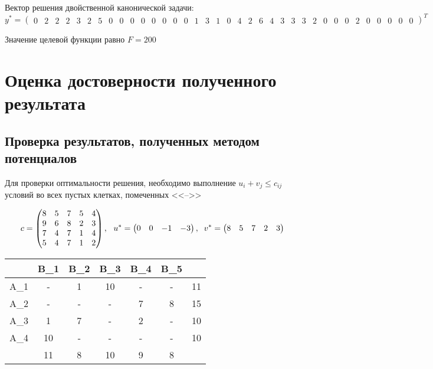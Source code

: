 \documentclass{article}
\begin{document}
\noindent Вектор решения двойственной канонической задачи: 
\begin{equation*}
    y^* = \begin{pmatrix}
        0& 2& 2& 2& 3& 2& 5 & 0& 0& 0& 0& 0 &0& 0& 0 & 1 & 3 & 1 & 0 & 4 & 2 & 6 & 4 & 3 & 3 & 3 & 2 & 0 & 0 & 0 & 2 &0 & 0 & 0 & 0 & 0
    \end{pmatrix}^T
\end{equation*}

\noindent Значение целевой функции равно $F=200$

\section{Оценка достоверности полученного результата}
\subsection{Проверка результатов, полученных методом потенциалов}
\noindent Для проверки оптимальности решения, необходимо выполнение $u_i+v_j \le c_{ij}$ условий во всех пустых клетках, помеченных <<-->>

\begin{equation*}
 c = 
    \begin{pmatrix}
        8 & 5 & 7 & 5 & 4 \\
        9 & 6 & 8 & 2 & 3\\
        7 & 4 & 7 & 1 & 4\\
        5 & 4 & 7 & 1 & 2\\
    \end{pmatrix},~~
u^*=
    \begin{pmatrix}
        0 &0 &-1 &-3
    \end{pmatrix}
,\;\;v^*=
    \begin{pmatrix}
        8 &5 &7 &2 &3
    \end{pmatrix}\\
\end{equation*}
\begin{table}[H]
    \centering
    \begin{tabular}{|c|c|c|c|c|c| |c|}
    \hline
        &\cellcolor{myGren} B_1 & \cellcolor{myGren}B_2 & \cellcolor{myGren}B_3 & \cellcolor{myGren}B_4 & \cellcolor{myGren} B_5 &  \\ \hline
       \cellcolor{myGren} A_1 &  - & 1 & 10 & - & - & 11\\ \hline
       \cellcolor{myGren} A_2 & - & - & - & 7 & 8 & 15\\  \hline
       \cellcolor{myGren} A_3 & 1 & 7 & - & 2 & - & 10\\ \hline
       \cellcolor{myGren} A_4 & 10 & - & - & - & - & 10\\ \hline \hline
            & 11 &  8 & 10 & 9 & 8 & \\
        \hline
    \end{tabular}
    \label{tab:my_label}
\end{table}
\end{document}
